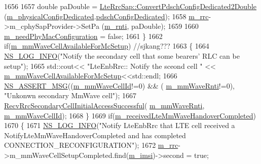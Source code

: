 \begin{DoxyCode}
1656 
1657         \textcolor{keywordtype}{double} paDouble = \hyperlink{classns3_1_1LteRrcSap_add6ee85098c06eeb3267175c4628a03a}{LteRrcSap::ConvertPdschConfigDedicated2Double}
       (\hyperlink{classns3_1_1UeManager_a5fca85495adcd0de6823e738094aacaf}{m\_physicalConfigDedicated}.\hyperlink{structns3_1_1LteRrcSap_1_1PhysicalConfigDedicated_a17e35740747a19ce9aebf834f50c2f4b}{pdschConfigDedicated});
1658         \hyperlink{classns3_1_1UeManager_ab4405e9f354c66e7c1a4c95832290f5b}{m\_rrc}->m\_cphySapProvider->SetPa (\hyperlink{classns3_1_1UeManager_a5a72b4fe818f21993bd7f05d7e2c4f83}{m\_rnti}, paDouble);
1659 
1660         \hyperlink{classns3_1_1UeManager_a2c655c5f3f0bdb4953405734118770df}{m\_needPhyMacConfiguration} = \textcolor{keyword}{false};
1661       \}
1662       \textcolor{keywordflow}{if}(\hyperlink{classns3_1_1UeManager_ad0ab1d98110575774a2d4da876878ad2}{m\_mmWaveCellAvailableForMcSetup}) \textcolor{comment}{//sjkang???}
1663       \{
1664         \hyperlink{group__logging_gafbd73ee2cf9f26b319f49086d8e860fb}{NS\_LOG\_INFO}(\textcolor{stringliteral}{"Notify the secondary cell that some bearers' RLC can be setup"});
1665         std::cout<< \textcolor{stringliteral}{"LteEnbRrc:: Notify the sceond cell "} << 
      \hyperlink{classns3_1_1UeManager_ad0ab1d98110575774a2d4da876878ad2}{m\_mmWaveCellAvailableForMcSetup}<<std::endl;
1666         \hyperlink{assert_8h_aff5ece9066c74e681e74999856f08539}{NS\_ASSERT\_MSG}((\hyperlink{classns3_1_1UeManager_a0f53cb816bd8a3ad6227dc9adca671b2}{m\_mmWaveCellId}!=0) && (
      \hyperlink{classns3_1_1UeManager_a3d5cf7dc8a13b9e2616ecb9a70faebd3}{m\_mmWaveRnti}!=0), \textcolor{stringliteral}{"Unkonwn secondary MmWave cell"});
1667         \hyperlink{classns3_1_1UeManager_a98a8c4fbacd2bbe62487e9ef228a0517}{RecvRrcSecondaryCellInitialAccessSuccessful}(
      \hyperlink{classns3_1_1UeManager_a3d5cf7dc8a13b9e2616ecb9a70faebd3}{m\_mmWaveRnti}, \hyperlink{classns3_1_1UeManager_a0f53cb816bd8a3ad6227dc9adca671b2}{m\_mmWaveCellId}); 
1668       \}
1669       \textcolor{keywordflow}{if}(\hyperlink{classns3_1_1UeManager_add440b9081bc11490fc5b7cf72c45115}{m\_receivedLteMmWaveHandoverCompleted})
1670       \{
1671         \hyperlink{group__logging_gafbd73ee2cf9f26b319f49086d8e860fb}{NS\_LOG\_INFO}(\textcolor{stringliteral}{"Notify LteEnbRrc that LTE cell received a NotifyLteMmWaveHandoverCompleted
       and has completed CONNECTION\_RECONFIGURATION"});
1672         \hyperlink{classns3_1_1UeManager_ab4405e9f354c66e7c1a4c95832290f5b}{m\_rrc}->m\_mmWaveCellSetupCompleted.find(\hyperlink{classns3_1_1UeManager_a868dda076ecfc1d4202e357c16223d84}{m\_imsi})->second = \textcolor{keyword}{true};

\end{DoxyCode}
